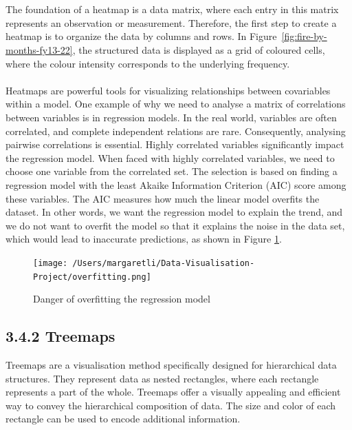 \documentclass{article}\usepackage[]{graphicx}\usepackage[]{xcolor}
\begin{document}
\\  
\\The foundation of a heatmap is a data matrix, where each entry in this matrix represents an observation or measurement. Therefore, the first step to create a heatmap is to organize the data by columns and rows. In Figure~\ref{fig:fire-by-months-fy13-22}, the structured data is displayed as a grid of coloured cells, where the colour intensity corresponds to the underlying frequency.
\\  
\\Heatmaps are powerful tools for visualizing relationships between covariables within a model. One example of why we need to analyse a matrix of correlations between variables is in regression models. In the real world, variables are often correlated, and complete independent relations are rare. Consequently, analysing pairwise correlations is essential. Highly correlated variables significantly impact the regression model. When faced with highly correlated variables, we need to choose one variable from the correlated set. The selection is based on finding a regression model with the least Akaike Information Criterion (AIC) score among these variables. The AIC measures how much the linear model overfits the dataset. In other words, we want the regression model to explain the trend, and we do not want to overfit the model so that it explains the noise in the data set, which would lead to inaccurate predictions, as shown in Figure \ref{fig:noisy}.


\begin{figure}[h]
    \centering
    \texttt{[image: /Users/margaretli/Data-Visualisation-Project/overfitting.png]}
    \caption{Danger of overfitting the regression model}
    \label{fig:noisy}
\end{figure}




\subsection{3.4.2 Treemaps}
Treemaps are a visualisation method specifically designed for hierarchical data structures. They represent data as nested rectangles, where each rectangle represents a part of the whole. Treemaps offer a visually appealing and efficient way to convey the hierarchical composition of data. The size and color of each rectangle can be used to encode additional information.
\end{document}
